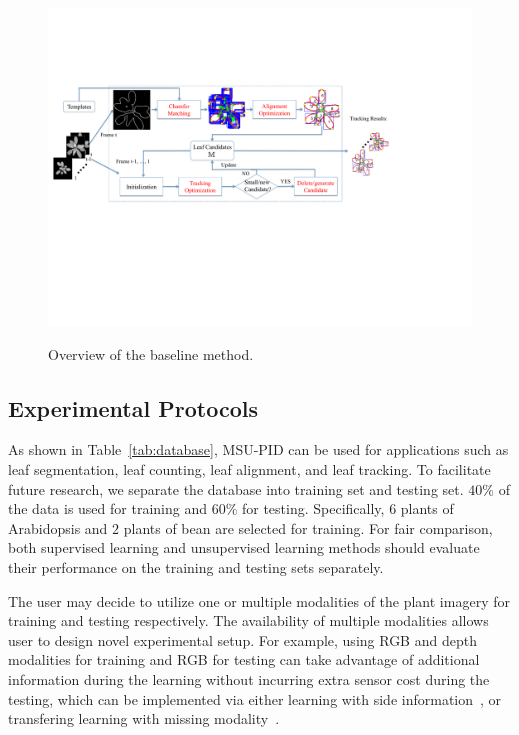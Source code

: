 \begin{figure}[t!]
\centering
\includegraphics[width=.98\textwidth]{Figures/overview}\\
\caption{Overview of the baseline method.}
\label{fig:methodOverview}
\end{figure}

\subsection{Experimental Protocols}
\label{sec:protocol}
As shown in Table~\ref{tab:database}, MSU-PID can be used for applications such as leaf segmentation, leaf counting, leaf alignment, and leaf tracking.
To facilitate future research, we separate the database into training set and testing set.
$40\%$ of the data is used for training and $60\%$ for testing.
Specifically, $6$ plants of Arabidopsis and $2$ plants of bean are selected for training.
For fair comparison, both supervised learning and unsupervised learning methods should evaluate their performance on the training and testing sets separately.

The user may decide to utilize one or multiple modalities of the plant imagery for training and testing respectively.
The availability of multiple modalities allows user to design novel experimental setup.
For example, using RGB and depth modalities for training and RGB for testing can take advantage of additional information during the learning without incurring extra sensor cost during the testing, which can be implemented via either learning with side information~\cite{chen2013boosting}, or transfering learning with missing modality~\cite{ding2014latent}.


